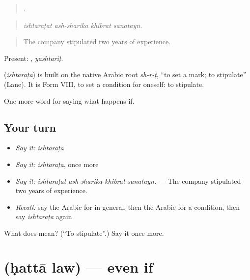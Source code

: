 \begin{quote}
   .
\end{quote}

\begin{quote}
\emph{ishtaraṭat ash-sharika khibrat sanatayn.}
\end{quote}

\begin{quote}
The company stipulated two years of experience.
\end{quote}

Present: , \emph{yashtariṭ}.

\begin{cousinweb}
\textbf{} (\emph{ishtaraṭa}) is built on the native Arabic root \emph{sh-r-ṭ}, \textquotedblleft{}to set a mark; to stipulate\textquotedblright{} (Lane). It is Form VIII, to set a condition for oneself: to stipulate.
\end{cousinweb}

\begin{grammarlens}[title={What you've built}]
One more word for saying what happens if.
\end{grammarlens}

\subsection*{Your turn}
\begin{itemize}
\raggedright
  \item \emph{Say it:} \emph{ishtaraṭa}
  \item \emph{Say it:} \emph{ishtaraṭa}, once more
  \item \emph{Say it:} \emph{ishtaraṭat ash-sharika khibrat sanatayn.} — The company stipulated two years of experience.
  \item \emph{Recall:} say the Arabic for in general, then the Arabic for a condition, then say \emph{ishtaraṭa} again
\end{itemize}

\begin{tcolorbox}[breakable,colback=teal!4,colframe=teal!35!black,title={Before you move on}]
What does  mean? (\textquotedblleft{}To stipulate\textquotedblright{}.) Say it once more.
\end{tcolorbox}
\section[\texorpdfstring{\ar{حتى} \ar{لو} (ḥattā law)}{حتى لو (ḥattā law)}]{  (ḥattā law) — even if}

